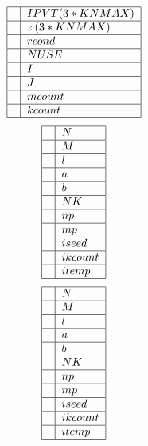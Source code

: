 \documentclass{article}
\begin{document}
\[
\begin{tabular}{|l|l|}
\hline
& $IPVT(3\ast KNMAX)$ \\ \hline
& $z\left( 3\ast KNMAX\right) $ \\ \hline
& $rcond$ \\ \hline
& $NUSE$ \\ \hline
& $I$ \\ \hline
& $J$ \\ \hline
& $mcount$ \\ \hline
& $kcount$ \\ \hline
\end{tabular}%
\]%
\[
\begin{tabular}{|l|l|}
\hline
& $N$ \\ \hline
& $M$ \\ \hline
& $l$ \\ \hline
& $a$ \\ \hline
& $b$ \\ \hline
& $NK$ \\ \hline
& $np$ \\ \hline
& $mp$ \\ \hline
& $iseed$ \\ \hline
& $ikcount$ \\ \hline
& $itemp$ \\ \hline
\end{tabular}%
\]%
\[
\begin{tabular}{|l|l|}
\hline
& $N$ \\ \hline
& $M$ \\ \hline
& $l$ \\ \hline
& $a$ \\ \hline
& $b$ \\ \hline
& $NK$ \\ \hline
& $np$ \\ \hline
& $mp$ \\ \hline
& $iseed$ \\ \hline
& $ikcount$ \\ \hline
& $itemp$ \\ \hline
\end{tabular}%
\]
\end{document}
